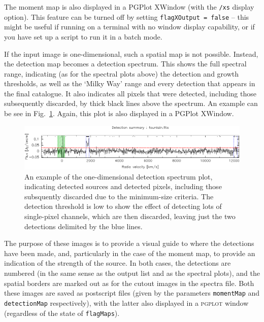 The moment map is also displayed in a PGPlot XWindow (with the
\texttt{/xs} display option). This feature can be turned off by
setting \texttt{flagXOutput = false} -- this might be useful if
running \duchamp on a terminal with no window display capability, or
if you have set up a script to run it in a batch mode.

If the input image is one-dimensional, such a spatial map is not
possible. Instead, the detection map becomes a detection
spectrum. This shows the full spectral range, indicating (as for the
spectral plots above) the detection and growth thresholds, as well as
the `Milky Way' range and every detection that appears in the final
catalogue. It also indicates all pixels that were detected, including
those subsequently discarded, by thick black lines above the
spectrum. An example can be see in
Fig.~\ref{fig-1D-detection-spectrum}. Again, this plot is also
displayed in a PGPlot XWindow.

\begin{figure}[!t]
  \begin{center}
    \includegraphics[width=\textwidth]{example_detection_spectrum}
  \end{center}
  \caption{\footnotesize An example of the one-dimensional detection
    spectrum plot, indicating detected sources and detected pixels,
    including those subsquently discarded due to the minimum-size
    criteria. The detection threshold is low to show the effect of
    detecting lots of single-pixel channels, which are then discarded,
    leaving just the two detections delimited by the blue lines.}
  \label{fig-1D-detection-spectrum}
\end{figure}



The purpose of these images is to provide a visual guide to where the
detections have been made, and, particularly in the case of the moment
map, to provide an indication of the strength of the source. In both
cases, the detections are numbered (in the same sense as the output
list and as the spectral plots), and the spatial borders are marked
out as for the cutout images in the spectra file. Both these images
are saved as postscript files (given by the parameters
\texttt{momentMap} and \texttt{detectionMap} respectively), with the
latter also displayed in a \textsc{pgplot} window (regardless of the
state of \texttt{flagMaps}).

